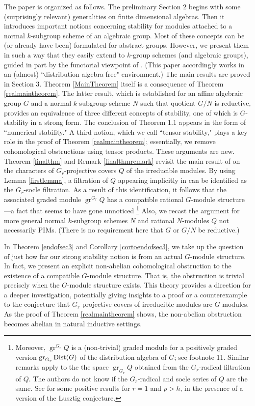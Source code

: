 \documentclass[11pt,leqno,amscd,amssymb,verbatim, url]{amsart}
\theoremstyle{definition}
\numberwithin{equation}{thm}
\newcommand{\gr}{\operatorname{ {gr}}}
\begin{document}
The paper is organized as follows. The preliminary Section 2 begins with some (surprisingly
relevant) generalities on finite dimensional algebras. Then
it  introduces important notions concerning stability for modules attached
to a normal $k$-subgroup scheme of an algebraic group. Most of these concepts can be (or already have been) formulated for abstract groups.
 However, we present them in such a way that they easily extend to $k$-group schemes (and algebraic groups), guided in part by the
functorial viewpoint of \cite{DG}. (This paper accordingly works in an (almost)  ``distribution algebra free" environment.)  The main results are proved in Section 3. Theorem \ref{MainTheorem} itself is a
consequence of Theorem \ref{realmaintheorem}. The latter result, which is established for an affine algebraic group $G$ and a normal $k$-subgroup scheme $N$ such that quotient $G/N$ is reductive, provides an equivalence of three different concepts of stability, one of which
is $G$-stability in a strong form. The
conclusion of Theorem 1.1 appears in the form of ``numerical stability." A third notion, which we call ``tensor stability,"
plays a key role in the proof of Theorem \ref{realmaintheorem}; essentially, we remove cohomological obstructions using
tensor products. These arguments are new. Theorem \ref{finalthm} and Remark \ref{finalthmremark} revisit
the main result of \cite{Donkin1} on the characters of $G_r$-projective covers $Q$ of the irreducible modules.
By using Lemma \ref{firstlemma}, a filtration of $Q$ appearing implicitly in \cite{Donkin1} can be identified
 as the $G_r$-socle filtration. As a result of this identification, it follows that the associated graded module $\gr^{G_r} Q$ has
 a compatible rational $G$-module structure---a fact that seems to have gone unnoticed
 \footnote{Moreover, $\gr^{G_r}Q$ is a (non-trivial) graded module for a positively graded version $\gr_{G_r}{\text{\rm Dist}}(G)$ of the
 distribution algebra of $G$; see footnote 11.  Similar remarks apply to the the space $\gr_{G_r}Q$ obtained from the $G_r$-radical
 filtration of $Q$.   The authors
   do not know if the $G_r$-radical and socle series of $Q$ are the same. See \cite[D14]{Jan} for some positive results for $r=1$ and $p>h$, in the presence
   of a version of the Lusztig conjecture.}  Also, we recast the argument for more general normal $k$-subgroup schemes $N$ and rational $N$-modules $Q$ not necessarily PIMs. (There is no requirement here that $G$ or $G/N$ be reductive.)

    In Theorem \ref{endofsec3} and Corollary \ref{cortoendofsec3}, we take up the question of just how far our strong stability
   notion is from an actual $G$-module structure. In fact, we present an explicit non-abelian cohomological obstruction to the
   existence of a compatible  $G$-module structure. That is, the obstruction is trivial precisely when the $G$-module structure exists. This theory provides a direction for a deeper investigation, potentially giving insights to a proof
   or a counterexample to the conjecture that $G_r$-projective
   covers of irreducible modules are $G$-modules. As the proof of Theorem \ref{realmaintheorem} shows, the
         non-abelian obstruction becomes abelian
         in natural inductive settings.
\end{document}
